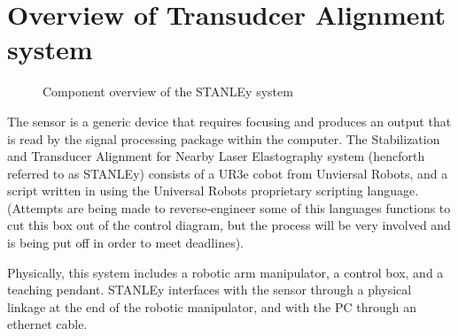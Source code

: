 \documentclass[11pt]{article}
\begin{document}
\section{Overview of Transudcer Alignment system}
\begin{figure}\label{fig:component_block_diagram}
\centering
{}
\caption{Component overview of the STANLEy system}
\end{figure}

The sensor is a generic device that requires focusing and produces an output that is read by the signal processing package within the computer. The Stabilization and Transducer Alignment for Nearby Laser Elastography system (hencforth referred to as STANLEy) consists of a UR3e cobot from Unviersal Robots, and a script written in using the Universal Robots proprietary scripting language.
(Attempts are being made to reverse-engineer some of this languages functions to cut this box out of the control diagram, but the process will be very involved and is being put off in order to meet deadlines).

Physically, this system includes a robotic arm manipulator, a control box, and a teaching pendant.
STANLEy interfaces with the sensor through a physical linkage at the end of the robotic manipulator, and with the PC through an ethernet cable.
\end{document}

